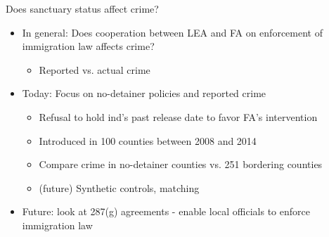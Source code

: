 \documentclass[xcolor=pdftex,dvipsnames,table,handout]{beamer}
\begin{document}
\begin{frame}{ Does sanctuary status affect crime?}
\pause
\begin{itemize}
\item In general: Does cooperation between LEA and FA on enforcement of immigration law affects crime?\vspace{0.10cm}
\begin{itemize}\pause
\item Reported vs. actual crime\pause
\end{itemize}\vspace{0.20cm}
\item Today: Focus on no-detainer policies and reported crime\vspace{0.10cm}\pause
\begin{itemize}
\item Refusal to hold ind's past release date to favor FA's intervention\vspace{0.10cm}\pause
\item Introduced in 100 counties between 2008 and 2014\vspace{0.10cm}\pause
\item Compare crime in no-detainer counties vs. 251 bordering counties\vspace{0.10cm}\pause
\item (future) Synthetic controls, matching
\end{itemize}\vspace{0.20cm}\pause
\item Future: look at 287(g) agreements - enable local officials to enforce immigration law
\end{itemize}
\end{frame}
\end{document}
